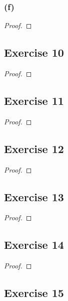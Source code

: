 \documentclass[14pt]{extarticle}
\begin{document}
\subsubsection{(f)}

\begin{proof}

\end{proof}

\subsection{Exercise 10}

\begin{proof}

\end{proof}

\subsection{Exercise 11}

\begin{proof}

\end{proof}

\subsection{Exercise 12}

\begin{proof}

\end{proof}

\subsection{Exercise 13}

\begin{proof}

\end{proof}

\subsection{Exercise 14}

\begin{proof}

\end{proof}

\subsection{Exercise 15}
\end{document}
